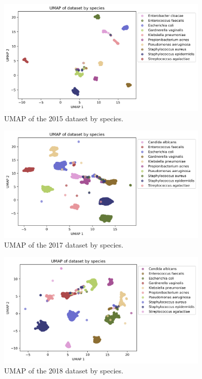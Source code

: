 \documentclass[english,11pt,a4paper,titlepage]{article}
\begin{document}
\begin{figure}[h]
	\centering
	\includegraphics[width=0.9\textwidth]{img/UMAP_species_noRemaining2015.png}
	\caption{UMAP of the 2015 dataset by species.}
	\label{fig:umap_2015}
\end{figure}

\begin{figure}[h]
	\centering
	\includegraphics[width=0.9\textwidth]{img/UMAP_species_noRemaining2017.png}
	\caption{UMAP of the 2017 dataset by species.}
	\label{fig:umap_2017}
\end{figure}

\begin{figure}[h]
	\centering
	\includegraphics[width=0.9\textwidth]{img/UMAP_species_noRemaining2018.png}
	\caption{UMAP of the 2018 dataset by species.}
	\label{fig:umap_2018}
\end{figure}
\end{document}
